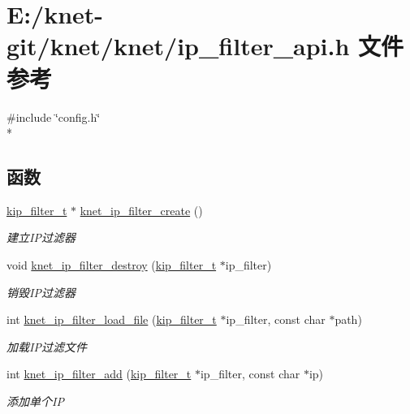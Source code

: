 \hypertarget{a00070}{}\section{E\+:/knet-\/git/knet/knet/ip\+\_\+filter\+\_\+api.h 文件参考}
\label{a00070}
{\ttfamily \#include \char`\"{}config.\+h\char`\"{}}\\*
\subsection*{函数}
\begin{DoxyCompactItemize}
\item 
\hyperlink{a00056_a1c0c604eecd86fc8895cf4bbbba566af_a1c0c604eecd86fc8895cf4bbbba566af}{kip\+\_\+filter\+\_\+t} $\ast$ \hyperlink{a00116_ga14e6d1c3709870a082f203c8ba0ca9f4_ga14e6d1c3709870a082f203c8ba0ca9f4}{knet\+\_\+ip\+\_\+filter\+\_\+create} ()
\begin{DoxyCompactList}\small\item\em 建立\+I\+P过滤器 \end{DoxyCompactList}\item 
void \hyperlink{a00116_gae2d8c7b5356b36261f90f59bc49181e1_gae2d8c7b5356b36261f90f59bc49181e1}{knet\+\_\+ip\+\_\+filter\+\_\+destroy} (\hyperlink{a00056_a1c0c604eecd86fc8895cf4bbbba566af_a1c0c604eecd86fc8895cf4bbbba566af}{kip\+\_\+filter\+\_\+t} $\ast$ip\+\_\+filter)
\begin{DoxyCompactList}\small\item\em 销毁\+I\+P过滤器 \end{DoxyCompactList}\item 
int \hyperlink{a00116_ga044a4fc59ee0910af3c2d030e025c536_ga044a4fc59ee0910af3c2d030e025c536}{knet\+\_\+ip\+\_\+filter\+\_\+load\+\_\+file} (\hyperlink{a00056_a1c0c604eecd86fc8895cf4bbbba566af_a1c0c604eecd86fc8895cf4bbbba566af}{kip\+\_\+filter\+\_\+t} $\ast$ip\+\_\+filter, const char $\ast$path)
\begin{DoxyCompactList}\small\item\em 加载\+I\+P过滤文件 \end{DoxyCompactList}\item 
int \hyperlink{a00116_ga271a51fad46aa61d322b6c9da2d5ba1e_ga271a51fad46aa61d322b6c9da2d5ba1e}{knet\+\_\+ip\+\_\+filter\+\_\+add} (\hyperlink{a00056_a1c0c604eecd86fc8895cf4bbbba566af_a1c0c604eecd86fc8895cf4bbbba566af}{kip\+\_\+filter\+\_\+t} $\ast$ip\+\_\+filter, const char $\ast$ip)
\begin{DoxyCompactList}\small\item\em 添加单个\+I\+P \end{DoxyCompactList}\item 

\end{DoxyCompactItemize}
